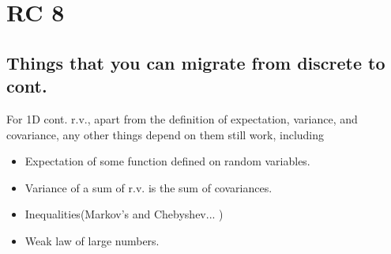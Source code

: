 \chapter{RC 8}

\section*{Things that you can migrate from discrete to cont.}
For 1D cont. r.v., apart from the definition of expectation, variance, and covariance, any other things depend on them still work, including
\begin{itemize}
    \item Expectation of some function defined on random variables. 
    \item Variance of a sum of r.v. is the sum of covariances. 
    \item Inequalities(Markov's and Chebyshev... )
    \item Weak law of large numbers.
\end{itemize}


